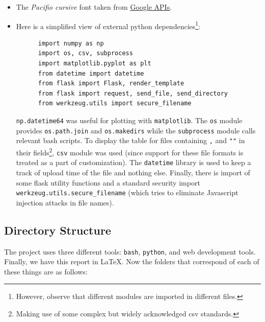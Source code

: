 \documentclass[11pt]{scrartcl}
\begin{document}
\begin{itemize}
  \item The \textit{Pacifio cursive} font taken from
    \href{https://fonts.googleapis.com/css2?family=Pacifico&display=swap}{Google APIs}.

  \item Here is a simplified view of external python
    dependencies\footnote{However, observe that different modules are imported
    in different files.}:
    \begin{verbatim}
      import numpy as np
      import os, csv, subprocess
      import matplotlib.pyplot as plt
      from datetime import datetime
      from flask import Flask, render_template
      from flask import request, send_file, send_directory
      from werkzeug.utils import secure_filename
    \end{verbatim}

    \texttt{np.datetime64} was useful for plotting with \texttt{matplotlib}.  The
    \texttt{os} module provides \texttt{os.path.join} and \texttt{os.makedirs}
    while the \texttt{subprocess} module calls relevant bash scripts. To
    display the table for files containing \texttt{,} and \texttt{""} in their
    fields\footnote{Making use of some complex but widely acknowledged csv
    standards.}, \texttt{csv} module was used (since support for these file
    formats is treated as a part of customization). The \texttt{datetime}
    library is used to keep a track of upload time of the file and nothing else.
    Finally, there is import of some flask utility functions and a standard
    security import \texttt{werkzeug.utils.secure\_filename} (which
    tries to eliminate Javascript injection attacks in file names).

\end{itemize}

\subsection{Directory Structure}
The project uses three different tools: \texttt{bash}, \texttt{python}, and web
development tools. Finally, we have this report in \LaTeX. Now the folders that
correspond of each of these things are as follows:
\end{document}

